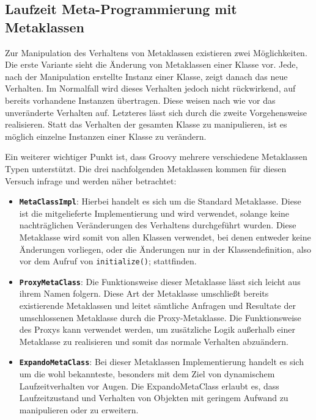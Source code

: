 
\subsection{Laufzeit Meta-Programmierung mit Metaklassen}
Zur Manipulation des Verhaltens von Metaklassen existieren zwei Möglichkeiten. 
Die erste Variante sieht die Änderung von Metaklassen einer Klasse vor.
Jede, nach der Manipulation erstellte Instanz einer Klasse, zeigt danach das neue Verhalten. 
Im Normalfall wird dieses Verhalten jedoch nicht rückwirkend, auf bereits vorhandene Instanzen übertragen. 
Diese weisen nach wie vor das unveränderte Verhalten auf. 
Letzteres lässt sich durch die zweite Vorgehensweise realisieren. 
Statt das Verhalten der gesamten Klasse zu manipulieren, ist es möglich einzelne Instanzen einer Klasse zu verändern. 

Ein weiterer wichtiger Punkt ist, dass Groovy mehrere verschiedene Metaklassen Typen unterstützt. 
Die drei nachfolgenden Metaklassen kommen für diesen Versuch infrage und werden näher betrachtet:


\begin{itemize}
	\item \textbf{\texttt{MetaClassImpl}}:
	Hierbei handelt es sich um die Standard Metaklasse. 
	Diese ist die mitgelieferte Implementierung und wird verwendet, solange keine nachträglichen Veränderungen des Verhaltens durchgeführt wurden. 
	Diese Metaklasse wird somit von allen Klassen verwendet, bei denen entweder keine Änderungen vorliegen, oder die Änderungen nur in der Klassendefinition, also vor dem Aufruf von \texttt{initialize()}; stattfinden.
	
	\item \textbf{\texttt{ProxyMetaClass}}:
	Die Funktionsweise dieser Metaklasse lässt sich leicht aus ihrem Namen folgern. 
	Diese Art der Metaklasse umschließt bereits existierende Metaklassen und leitet sämtliche Anfragen und Resultate der umschlossenen Metaklasse durch die Proxy-Metaklasse. 
	Die Funktionsweise des Proxys kann verwendet werden, um zusätzliche Logik außerhalb einer Metaklasse zu realisieren und somit das normale Verhalten abzuändern.
	
	\item \textbf{\texttt{ExpandoMetaClass}}:
	Bei dieser Metaklassen Implementierung handelt es sich um die wohl bekannteste, besonders mit dem Ziel von dynamischem Laufzeitverhalten vor Augen. 
	Die ExpandoMetaClass erlaubt es, dass Laufzeitzustand und Verhalten von Objekten mit geringem Aufwand zu manipulieren oder zu erweitern.
\end{itemize}


